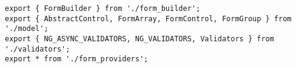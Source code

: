 \begin{verbatim}
export { FormBuilder } from './form_builder';
export { AbstractControl, FormArray, FormControl, FormGroup } from './model';
export { NG_ASYNC_VALIDATORS, NG_VALIDATORS, Validators } from './validators';
export * from './form_providers';
\end{verbatim}
